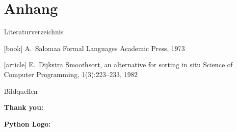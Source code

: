\section{Anhang}
\begin{frame}{Literaturverzeichnis}
    \begin{thebibliography}{Längste Bezeichnung}
        [book]
            A.~Salomaa
            \newblock Formal Languages
            \newblock Academic Press, 1973

        [article]
            E.~Dijkstra
            \newblock Smoothsort, an alternative for sorting in situ
            \newblock Science of Computer Programming, 1(3):223--233, 1982
    \end{thebibliography}
\end{frame}

{
    \tiny
    \begin{frame}[allowframebreaks]{Bildquellen}

        \begin{minipage}{\textwidth}
            \textbf{Thank you:} \\
        \end{minipage}
        
        \begin{minipage}{\textwidth}
            \textbf{Python Logo:} \\
        \end{minipage}

    \end{frame}
}
